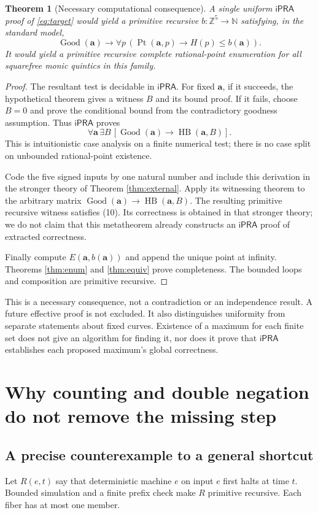\documentclass[11pt,letterpaper]{article}
\newcommand{\iPRA}{\mathsf{iPRA}}
\newcommand{\N}{\mathbb N}
\newcommand{\Z}{\mathbb Z}
\newcommand{\Good}{\operatorname{Good}}
\newcommand{\Pt}{\operatorname{Pt}}
\newcommand{\HB}{\operatorname{HB}}
\newtheorem{theorem}{Theorem}[section]
\theoremstyle{definition}
\begin{document}
\begin{theorem}[Necessary computational consequence]\label{thm:necessary}
A single uniform $\iPRA$ proof of \eqref{eq:target} would yield a
primitive recursive $b:\Z^5\to\N$ satisfying, in the standard model,
\[
 \Good(\mathbf a)\to
 \forall p\,(\Pt(\mathbf a,p)\to H(p)\leq b(\mathbf a)).     \tag{10}
\]
It would yield a primitive recursive complete rational-point enumeration
for all squarefree monic quintics in this family.
\end{theorem}
\begin{proof}
The resultant test is decidable in $\iPRA$.
For fixed $\mathbf a$, if it succeeds, the hypothetical theorem gives
a witness $B$ and its bound proof. If it fails, choose $B=0$ and prove
the conditional bound from the contradictory goodness assumption.
Thus $\iPRA$ proves
\[
 \forall\mathbf a\,\exists B\,
                    [\Good(\mathbf a)\to\HB(\mathbf a,B)]. \tag{11}
\]
This is intuitionistic case analysis on a finite numerical test;
there is no case split on unbounded rational-point existence.

Code the five signed inputs by one natural number and include this
derivation in the stronger theory of Theorem \ref{thm:external}.
Apply its witnessing theorem to the arbitrary matrix
$\Good(\mathbf a)\to\HB(\mathbf a,B)$. The resulting primitive
recursive witness satisfies (10). Its correctness is obtained in that
stronger theory; we do not claim that this metatheorem already constructs
an $\iPRA$ proof of extracted correctness.

Finally compute $E(\mathbf a,b(\mathbf a))$ and append the unique point
at infinity. Theorems \ref{thm:enum} and \ref{thm:equiv} prove
completeness. The bounded loops and composition are primitive recursive.
\end{proof}

This is a necessary consequence, not a contradiction or an independence
result. A future effective proof is not excluded. It also distinguishes
uniformity from separate statements about fixed curves. Existence of a
maximum for each finite set does not give an algorithm for finding it,
nor does it prove that $\iPRA$ establishes each proposed maximum's
global correctness.

\section{Why counting and double negation do not remove the missing step}
\label{sec:logic}
\subsection{A precise counterexample to a general shortcut}
Let $R(e,t)$ say that deterministic machine $e$ on input $e$ first halts
at time $t$. Bounded simulation and a finite prefix check make $R$
primitive recursive. Each fiber has at most one member.
\end{document}
